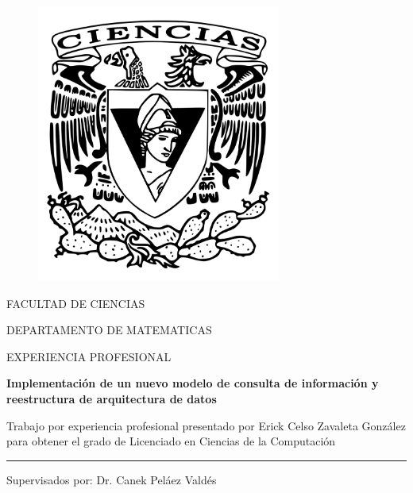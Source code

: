 \begin{titlepage}

  \begin{center}

    \vspace*{-1in}
    \begin{figure}[htb]
      \begin{center}
        \includegraphics[width=8cm]{ciencias2}
      \end{center}
    \end{figure}

    FACULTAD DE CIENCIAS

    \vspace*{0.15in}

    DEPARTAMENTO DE MATEMATICAS

    \vspace*{0.6in}

    \begin{large}
      EXPERIENCIA PROFESIONAL
    \end{large}

    \vspace*{0.2in}

    \begin{Large}
      \textbf{Implementación de un nuevo modelo de consulta de información y
        reestructura de arquitectura de datos}
    \end{Large}

    \vspace*{0.3in}

    \begin{large}
      Trabajo por experiencia profesional presentado por Erick Celso Zavaleta
      González para obtener el grado de Licenciado en Ciencias de la Computación
    \end{large}

    \vspace*{0.3in}
    \rule{80mm}{0.1mm}
    \vspace*{0.1in}

    \begin{large}
      Supervisados por: Dr. Canek Peláez Valdés
    \end{large}

  \end{center}

\end{titlepage}

